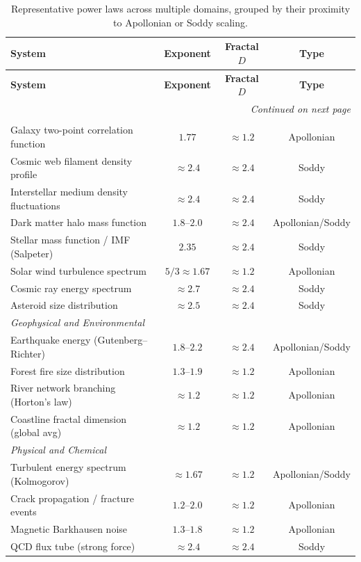 \documentclass[11pt,a4paper]{article}
\begin{document}
\begin{longtable}{p{6.8cm}ccc}
\caption{Representative power laws across multiple domains, grouped by their proximity to Apollonian or Soddy scaling.} \\
\toprule
\textbf{System} & \textbf{Exponent} & \textbf{Fractal $D$} & \textbf{Type} \\
\midrule
\endfirsthead
\toprule
\textbf{System} & \textbf{Exponent} & \textbf{Fractal $D$} & \textbf{Type} \\
\midrule
\endhead
\midrule\multicolumn{4}{r}{\textit{Continued on next page}}\\\endfoot
\bottomrule\endlastfoot

\multicolumn{4}{l}{\textit{Astrophysical and Cosmological}} \\
\midrule
Galaxy two-point correlation function & $1.77$ & $\approx1.2$ & Apollonian \\
Cosmic web filament density profile & $\approx2.4$ & $\approx2.4$ & Soddy \\
Interstellar medium density fluctuations & $\approx2.4$ & $\approx2.4$ & Soddy \\
Dark matter halo mass function & $1.8$--$2.0$ & $\approx2.4$ & Apollonian/Soddy \\
Stellar mass function / IMF (Salpeter) & $2.35$ & $\approx2.4$ & Soddy \\
Solar wind turbulence spectrum & $5/3\approx1.67$ & $\approx1.2$ & Apollonian \\
Cosmic ray energy spectrum & $\approx2.7$ & $\approx2.4$ & Soddy \\
Asteroid size distribution & $\approx2.5$ & $\approx2.4$ & Soddy \\

\midrule
\multicolumn{4}{l}{\textit{Geophysical and Environmental}} \\
\midrule
Earthquake energy (Gutenberg--Richter) & $1.8$--$2.2$ & $\approx2.4$ & Apollonian/Soddy \\
Forest fire size distribution & $1.3$--$1.9$ & $\approx1.2$ & Apollonian \\
River network branching (Horton's law) & $\approx1.2$ & $\approx1.2$ & Apollonian \\
Coastline fractal dimension (global avg) & $\approx1.2$ & $\approx1.2$ & Apollonian \\

\midrule
\multicolumn{4}{l}{\textit{Physical and Chemical}} \\
\midrule
Turbulent energy spectrum (Kolmogorov) & $\approx1.67$ & $\approx1.2$ & Apollonian/Soddy \\
Crack propagation / fracture events & $1.2$--$2.0$ & $\approx1.2$ & Apollonian \\
Magnetic Barkhausen noise & $1.3$--$1.8$ & $\approx1.2$ & Apollonian \\
QCD flux tube (strong force) & $\approx2.4$ & $\approx2.4$ & Soddy \\


\end{longtable}
\end{document}
